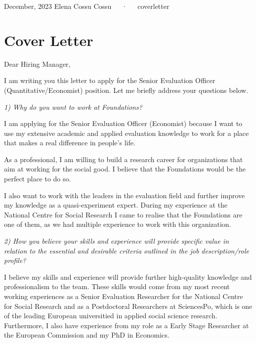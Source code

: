 \documentclass[11pt,a4paper,]{awesome-cv}
\begin{document}
\makecvheader

\makecvfooter
  {December, 2023}
    {Elena Cossu Cossu~~~·~~~coverletter}
  {\thepage}





\hypertarget{cover-letter}{%
\section{Cover Letter}\label{cover-letter}}

Dear Hiring Manager,

I am writing you this letter to apply for the Senior Evaluation Officer
(Quantitative/Economist) position. Let me briefly address your questions
below.

\emph{1) Why do you want to work at Foundations?}

I am applying for the Senior Evaluation Officer (Economist) because I
want to use my extensive academic and applied evaluation knowledge to
work for a place that makes a real difference in people's life.

As a professional, I am willing to build a research career for
organizations that aim at working for the social good. I believe that
the Foundations would be the perfect place to do so.

I also want to work with the leaders in the evaluation field and further
improve my knowledge as a quasi-experiment expert. During my experience
at the National Centre for Social Research I came to realise that the
Foundations are one of them, as we had multiple experience to work with
this organization.

\emph{2) How you believe your skills and experience will provide
specific value in relation to the essential and desirable criteria
outlined in the job description/role profile?}

I believe my skills and experience will provide further high-quality
knowledge and professionalism to the team. These skills would come from
my most recent working experiences as a Senior Evaluation Researcher for
the National Centre for Social Research and as a Postdoctoral
Researchers at SciencesPo, which is one of the leading European
universitied in applied social science research. Furthermore, I also
have experience from my role as a Early Stage Researcher at the European
Commission and my PhD in Economics.
\end{document}
